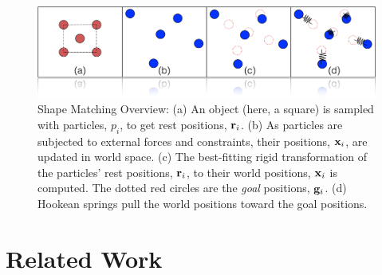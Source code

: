 \documentclass[review]{acmsiggraph}
\begin{document}


\begin{figure}
\includegraphics[width=\linewidth]{Figures/shapematching.png}
\caption{Shape Matching Overview: (a) An object (here, a square) is sampled with particles, $p_i$, to get rest positions, $\mathit{\mathbf{r}}_i$.  
(b) As particles are subjected to external forces and constraints, their positions, $\mathit{\mathbf{x}}_i$, are updated in world space.  
(c)  The best-fitting rigid transformation of the particles' rest positions, $\mathit{\mathbf{r}}_i$, 
to their world positions, $\mathit{\mathbf{x}}_i$ is computed.  The dotted red circles are the {\em goal} positions, $\mathit{\mathbf{g}}_i$.  
(d) Hookean springs pull the world positions toward the goal positions.}
\label{fig:shapematching}
\end{figure}

\section{Related Work}
\end{document}
